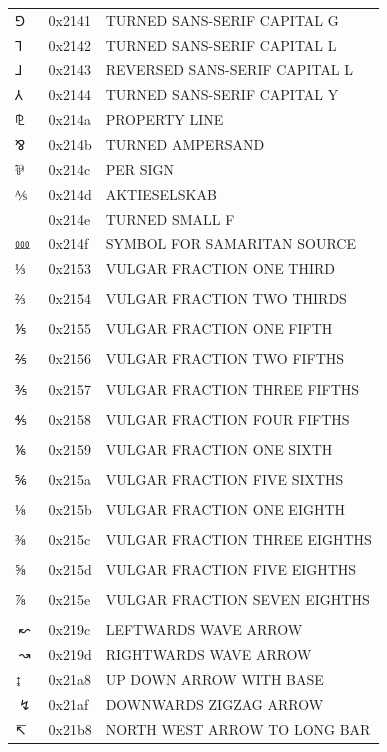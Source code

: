 \documentclass[12pt, twoside]{article}
\begin{document}
\begin{longtable}{L{1.0cm} L{2.0cm} >{\footnotesize}L{10cm}}
$⅁$&0x2141&TURNED SANS-SERIF CAPITAL G\\
$⅂$&0x2142&TURNED SANS-SERIF CAPITAL L\\
$⅃$&0x2143&REVERSED SANS-SERIF CAPITAL L\\
$⅄$&0x2144&TURNED SANS-SERIF CAPITAL Y\\
$⅊$&0x214a&PROPERTY LINE\\
$⅋$&0x214b&TURNED AMPERSAND\\
$⅌$&0x214c&PER SIGN\\
$⅍$&0x214d&AKTIESELSKAB\\
&0x214e&TURNED SMALL F\\
$⅏$&0x214f&SYMBOL FOR SAMARITAN SOURCE\\
$⅓$&0x2153&VULGAR FRACTION ONE THIRD\\
\\
$⅔$&0x2154&VULGAR FRACTION TWO THIRDS\\
\\
$⅕$&0x2155&VULGAR FRACTION ONE FIFTH\\
\\
$⅖$&0x2156&VULGAR FRACTION TWO FIFTHS\\
\\
$⅗$&0x2157&VULGAR FRACTION THREE FIFTHS\\
\\
$⅘$&0x2158&VULGAR FRACTION FOUR FIFTHS\\
\\
$⅙$&0x2159&VULGAR FRACTION ONE SIXTH\\
\\
$⅚$&0x215a&VULGAR FRACTION FIVE SIXTHS\\
\\
$⅛$&0x215b&VULGAR FRACTION ONE EIGHTH\\
\\
$⅜$&0x215c&VULGAR FRACTION THREE EIGHTHS\\
\\
$⅝$&0x215d&VULGAR FRACTION FIVE EIGHTHS\\
\\
$⅞$&0x215e&VULGAR FRACTION SEVEN EIGHTHS\\
\\
$↜$&0x219c&LEFTWARDS WAVE ARROW\\
$↝$&0x219d&RIGHTWARDS WAVE ARROW\\
$↨$&0x21a8&UP DOWN ARROW WITH BASE\\
$↯$&0x21af&DOWNWARDS ZIGZAG ARROW\\
$↸$&0x21b8&NORTH WEST ARROW TO LONG BAR\\

\end{longtable}
\end{document}
